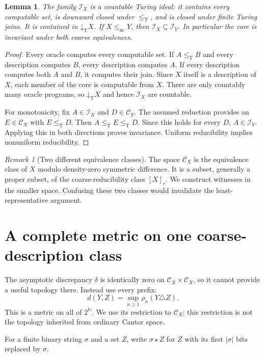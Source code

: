 \documentclass[11pt,a4paper]{article}
\newcommand{\N}{\mathbb N}
\newcommand{\Cantor}{2^{\N}}
\newcommand{\leT}{\leq_{\mathrm T}}
\newcommand{\nc}{\mathrm{nc}}
\newcommand{\CD}{\mathcal C}
\newcommand{\core}{\mathcal I}
\newcommand{\low}[1]{\mathord\downarrow_{\!\mathrm T}#1}
\newcommand{\patch}{\mathbin\star}
\newtheorem{lemma}[theorem]{Lemma}
\theoremstyle{definition}\newtheorem{definition}[theorem]{Definition}
\theoremstyle{remark}\newtheorem{remark}[theorem]{Remark}
\begin{document}
\begin{lemma}\label{lem:ideal}
The family $\core_X$ is a countable Turing ideal: it contains every computable
set, is downward closed under $\leT$, and is closed under finite Turing joins.
It is contained in $\low X$. If $X\le_{\nc}Y$, then
$\core_X\subseteq\core_Y$. In particular the core is invariant under both
coarse equivalences.
\end{lemma}
\begin{proof}
Every oracle computes every computable set. If $A\leT B$ and every description
computes $B$, every description computes $A$. If every description computes
both $A$ and $B$, it computes their join. Since $X$ itself is a description of
$X$, each member of the core is computable from $X$. There are only countably
many oracle programs, so $\low X$ and hence $\core_X$ are countable.

For monotonicity, fix $A\in\core_X$ and $D\in\CD_Y$. The assumed reduction
provides an $E\in\CD_X$ with $E\leT D$. Then $A\leT E\leT D$. Since this holds
for every $D$, $A\in\core_Y$. Applying this in both directions proves
invariance. Uniform reducibility implies nonuniform reducibility.
\end{proof}

\begin{remark}[Two different equivalence classes]
The space $\CD_X$ is the equivalence class of $X$ modulo density-zero
symmetric difference. It is a subset, generally a proper subset, of the
coarse-reducibility class $[X]_r$. We construct witnesses in the smaller
space. Confusing these two classes would invalidate the least-representative
argument.
\end{remark}

\section{A complete metric on one coarse-description class}
\label{sec:metric}
The asymptotic discrepancy $\delta$ is identically zero on $\CD_X\times\CD_X$,
so it cannot provide a useful topology there. Instead use every prefix:
\begin{equation}\label{eq:dmetric}
 d(Y,Z)=\sup_{n\ge1}\rho_n(Y\triangle Z).
\end{equation}
This is a metric on all of $\Cantor$. We use its restriction to $\CD_X$;
this restriction is not the topology inherited from ordinary Cantor space.

For a finite binary string $\sigma$ and a set $Z$, write $\sigma\patch Z$ for
$Z$ with its first $|\sigma|$ bits replaced by $\sigma$.
\end{document}

